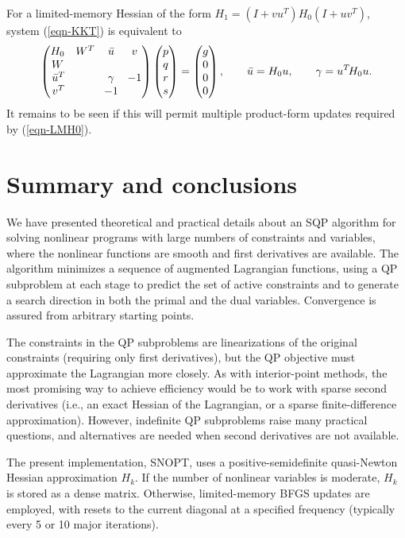 \documentclass[draft,leqno,onefignum,onetabnum]{siamltex}
\def\T{^T\!}
\newcommand{\ubar}{\skew3\bar u}
\def\SNOPT {{\small SNOPT}}
\newcommand{\pmat}[1]{\begin{pmatrix}#1\end{pmatrix}}
\begin{document}
For a limited-memory Hessian of the form $ H_1 = (I + vu^T)H_0(I + uv^T)$,
system (\ref{eqn-KKT}) is equivalent to
\[
  \pmat{ H_0 & W^T & \ubar & v
      \\ W
      \\ \ubar\T & & \gamma & -1
      \\ v\T     & & \!-1\! }
  \pmat{p\\q\\r\\s} = \pmat{g\\0\\0\\0},
  \qquad
  \ubar = H_0 u, \qquad \gamma = u\T H_0 u.
\]
It remains to be seen if this will permit multiple
product-form updates required by (\ref{eqn-LMH0}).




 \section{Summary and conclusions} \label{sec-conclusions}

We have presented theoretical and practical details about
an SQP algorithm for solving nonlinear programs with large numbers
of constraints and variables, where the nonlinear functions are
smooth and first derivatives are available.
The algorithm minimizes a sequence of augmented Lagrangian functions,
using a QP subproblem at each stage to predict the set of active
constraints and to generate a search direction
in both the primal and the dual variables.
Convergence is assured from arbitrary starting points.

The constraints in the QP subproblems are linearizations of the
original constraints (requiring only first derivatives),
but the QP objective must approximate the Lagrangian more closely.
As with interior-point methods, the most promising way to achieve
efficiency %
would be to work with sparse second
derivatives (i.e., an exact Hessian of the Lagrangian, or a
sparse finite-difference approximation).  However, indefinite QP
subproblems raise many practical questions, and alternatives are needed
when second derivatives are not available.

The present implementation, \SNOPT, uses a positive-semidefinite
quasi-Newton Hessian approximation $H_k$.
If the number of nonlinear variables is moderate, $H_k$ is stored as a
dense matrix.  Otherwise, limited-memory BFGS updates are employed,
with resets to the current diagonal at a specified frequency
(typically every 5 or 10 major iterations).
\end{document}
